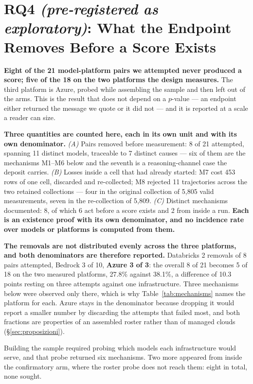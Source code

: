 \section{RQ4 \emph{(pre-registered as exploratory)}: What the Endpoint Removes Before a
Score Exists}
\label{sec:census}

\textbf{Eight of the 21 model-platform pairs we attempted never produced a score; five of the 18 on the
two platforms the design measures.} The third platform is Azure, probed while assembling the sample and
then left out of the arms. This is the result that does not depend on a $p$-value --- an endpoint either
returned the message we quote or it did not --- and it is reported at a scale a reader can size.

\textbf{Three quantities are counted here, each in its own unit and with its own denominator.}
\emph{(A)} Pairs removed before measurement: 8 of 21 attempted, spanning
11 distinct models, traceable to 7 distinct causes --- six of them are the mechanisms M1--M6 below and the
seventh is a reasoning-channel case the deposit carries. \emph{(B)} Losses inside a cell that had already
started: M7 cost 453 rows of one cell, discarded and re-collected; M8 rejected 11 trajectories across the
two retained collections --- four in the original collection of 5{,}805 valid measurements, seven in the
re-collection of 5{,}809. \emph{(C)} Distinct mechanisms
documented: 8, of which 6 act before a score exists and 2 from inside a run. \textbf{Each is an existence
proof with its own denominator, and no incidence rate over models or platforms is computed from them.}

\textbf{The removals are not distributed evenly across the three platforms, and both denominators are
therefore reported.} Databricks 2 removals of 8 pairs attempted, Bedrock 3 of 10, \textbf{Azure 3 of 3}: the
overall 8 of 21 becomes 5 of 18 on the two measured platforms, 27.8\% against 38.1\%, a difference of 10.3
points resting on three attempts against one infrastructure. Three mechanisms below were observed only
there, which is why Table~\ref{tab:mechanisms} names the platform for each. Azure stays in the denominator
because dropping it would report a smaller number by discarding the attempts that failed most, and both
fractions are properties of an assembled roster rather than of managed clouds
(\S\ref{sec:proposizioni}).

Building the sample required probing which models each infrastructure would serve, and that probe returned
six mechanisms. Two more appeared from inside the confirmatory arm, where the roster probe does not reach
them: eight in total, none sought.

